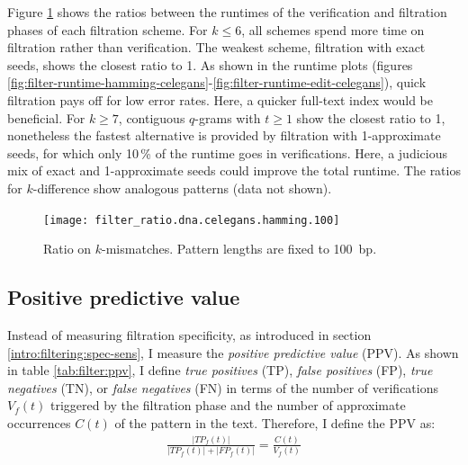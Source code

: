 Figure \ref{fig:filter-ratio-hamming-celegans} shows the ratios between the runtimes of the verification and filtration phases of each filtration scheme.
For $k \leq 6$, all schemes spend more time on filtration rather than verification.
The weakest scheme, filtration with exact seeds, shows the closest ratio to 1.
As shown in the runtime plots (figures \ref{fig:filter-runtime-hamming-celegans}-\ref{fig:filter-runtime-edit-celegans}), quick filtration pays off for low error rates.
Here, a quicker full-text index would be beneficial.
For $k \geq 7$, contiguous $q$-grams with $t \geq 1$ show the closest ratio to 1, nonetheless the fastest alternative is provided by filtration with 1-approximate seeds, for which only 10\,\% of the runtime goes in verifications.
Here, a judicious mix of exact and 1-approximate seeds could improve the total runtime.
The ratios for $k$-difference show analogous patterns (data not shown).

\begin{figure}[h]
\begin{center}
\caption[Ratio on $k$-mismatches]{Ratio on $k$-mismatches. Pattern lengths are fixed to 100~bp.}
\label{fig:filter-ratio-hamming-celegans}
\texttt{[image: filter\_ratio.dna.celegans.hamming.100]}
\end{center}
\end{figure}


\subsection{Positive predictive value}

Instead of measuring filtration specificity, as introduced in section \ref{intro:filtering:spec-sens}, I measure the \emph{positive predictive value} (PPV).
As shown in table \ref{tab:filter:ppv}, I define \emph{true positives} (TP), \emph{false positives} (FP), \emph{true negatives} (TN), or \emph{false negatives} (FN) in terms of the number of verifications $V_f(t)$ triggered by the filtration phase and the number of approximate occurrences $C(t)$ of the pattern in the text.
Therefore, I define the PPV as:
\begin{eqnarray}
\frac{|TP_f(t)|}{|TP_f(t)| + |FP_f(t)|} = \frac{C(t)}{V_f(t)}
\end{eqnarray}


